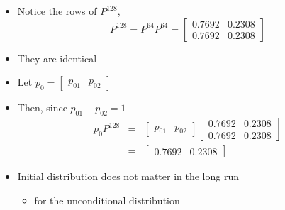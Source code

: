 \documentclass[notes=show]{beamer}
\begin{document}
\begin{frame}%


\begin{itemize}
\item Notice the rows of $P^{128}$,%
\[
P^{128}=P^{64}P^{64}=\left[ 
\begin{array}{cc}
0.7692 & 0.2308 \\ 
0.7692 & 0.2308%
\end{array}%
\right] 
\]

\item They are identical

\item Let $p_{0}=\left[ 
\begin{array}{cc}
p_{01} & p_{02}%
\end{array}%
\right] $

\item Then, since $p_{01}+p_{02}=1$ 
\begin{eqnarray*}
p_{0}P^{128} &=&\left[ 
\begin{array}{cc}
p_{01} & p_{02}%
\end{array}%
\right] \left[ 
\begin{array}{cc}
0.7692 & 0.2308 \\ 
0.7692 & 0.2308%
\end{array}%
\right] \\
&=&\left[ 
\begin{array}{cc}
0.7692 & 0.2308%
\end{array}%
\right]
\end{eqnarray*}

\item Initial distribution does not matter in the long run

\begin{itemize}
\item for the unconditional distribution
\end{itemize}
\end{itemize}

\end{frame}%
\end{document}
